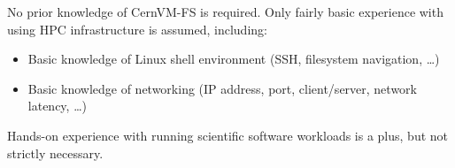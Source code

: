 No prior knowledge of CernVM-FS is required.
Only fairly basic experience with using HPC infrastructure is assumed, including:

\begin{itemize}
\item Basic knowledge of Linux shell environment (SSH, filesystem navigation, \ldots)
\item Basic knowledge of networking (IP address, port, client/server, network latency, \ldots)
\end{itemize}

\noindent Hands-on experience with running scientific software workloads is a plus, but not strictly necessary.


